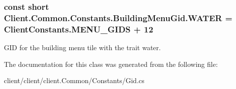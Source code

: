 \hypertarget{classClient_1_1Common_1_1Constants_1_1BuildingMenuGid_ace1825e05572f77b2d479b6806163283}{}
\subsubsection[{W\+A\+T\+E\+R}]{\setlength{\rightskip}{0pt plus 5cm}const short Client.\+Common.\+Constants.\+Building\+Menu\+Gid.\+W\+A\+T\+E\+R = {\bf Client\+Constants.\+M\+E\+N\+U\+\_\+\+G\+I\+D\+S} + 12}\label{classClient_1_1Common_1_1Constants_1_1BuildingMenuGid_ace1825e05572f77b2d479b6806163283}


G\+I\+D for the building menu tile with the trait water. 



The documentation for this class was generated from the following file\+:\begin{DoxyCompactItemize}
\item 
client/client/client.\+Common/\+Constants/Gid.\+cs\end{DoxyCompactItemize}

